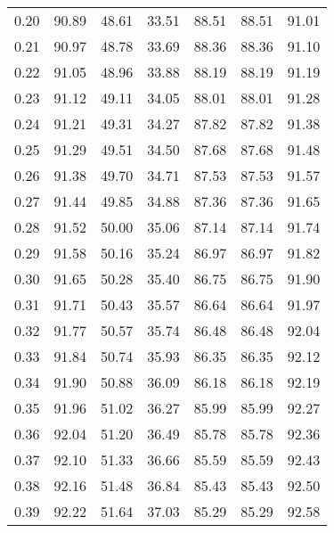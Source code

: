 \begin{tabular}{|c|c|c|c|c|c|c|}
      0.20 &     90.89 &     48.61 &      33.51 &   88.51 &      88.51 &         91.01 \\
      0.21 &     90.97 &     48.78 &      33.69 &   88.36 &      88.36 &         91.10 \\
      0.22 &     91.05 &     48.96 &      33.88 &   88.19 &      88.19 &         91.19 \\
      0.23 &     91.12 &     49.11 &      34.05 &   88.01 &      88.01 &         91.28 \\
      0.24 &     91.21 &     49.31 &      34.27 &   87.82 &      87.82 &         91.38 \\
      0.25 &     91.29 &     49.51 &      34.50 &   87.68 &      87.68 &         91.48 \\
      0.26 &     91.38 &     49.70 &      34.71 &   87.53 &      87.53 &         91.57 \\
      0.27 &     91.44 &     49.85 &      34.88 &   87.36 &      87.36 &         91.65 \\
      0.28 &     91.52 &     50.00 &      35.06 &   87.14 &      87.14 &         91.74 \\
      0.29 &     91.58 &     50.16 &      35.24 &   86.97 &      86.97 &         91.82 \\
      0.30 &     91.65 &     50.28 &      35.40 &   86.75 &      86.75 &         91.90 \\
      0.31 &     91.71 &     50.43 &      35.57 &   86.64 &      86.64 &         91.97 \\
      0.32 &     91.77 &     50.57 &      35.74 &   86.48 &      86.48 &         92.04 \\
      0.33 &     91.84 &     50.74 &      35.93 &   86.35 &      86.35 &         92.12 \\
      0.34 &     91.90 &     50.88 &      36.09 &   86.18 &      86.18 &         92.19 \\
      0.35 &     91.96 &     51.02 &      36.27 &   85.99 &      85.99 &         92.27 \\
      0.36 &     92.04 &     51.20 &      36.49 &   85.78 &      85.78 &         92.36 \\
      0.37 &     92.10 &     51.33 &      36.66 &   85.59 &      85.59 &         92.43 \\
      0.38 &     92.16 &     51.48 &      36.84 &   85.43 &      85.43 &         92.50 \\
      0.39 &     92.22 &     51.64 &      37.03 &   85.29 &      85.29 &         92.58 \\

\end{tabular}
